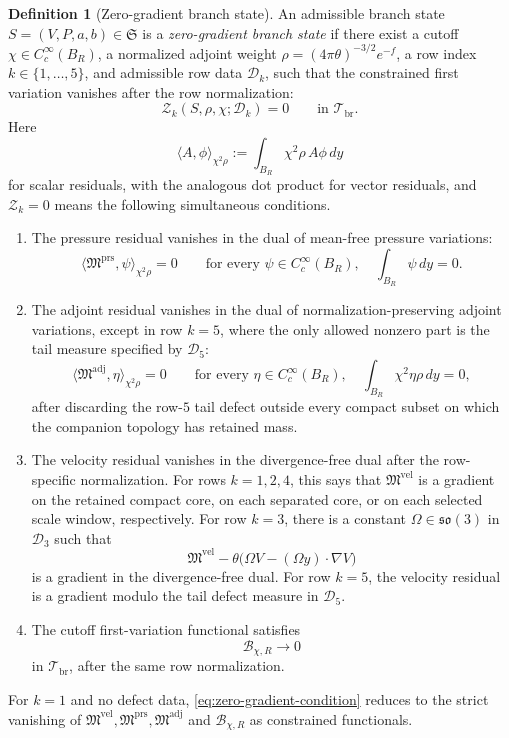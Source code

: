 \documentclass[11pt]{amsart}
\numberwithin{equation}{section}
\theoremstyle{plain}
\theoremstyle{definition}
\newtheorem{definition}[theorem]{Definition}
\theoremstyle{remark}
\newcommand{\State}{\mathfrak S}
\begin{document}
\begin{definition}[Zero-gradient branch state]
\label{def:zero-gradient-state}
An admissible branch state \(S=(V,P,a,b)\in\State\) is a
\emph{zero-gradient branch state} if there exist a cutoff
\(\chi\in C_c^\infty(B_R)\), a normalized adjoint weight
\(\rho=(4\pi\theta)^{-3/2}e^{-f}\), a row index
\(k\in\{1,\dots,5\}\), and admissible row data \(\mathcal D_k\), such that
the constrained first variation vanishes after the row normalization:
\begin{equation}\label{eq:zero-gradient-condition}
	\mathcal Z_k(S,\rho,\chi;\mathcal D_k)=0
	\qquad\text{in }\mathcal T_{\mathrm{br}}.
\end{equation}
Here
\[
	\langle A,\phi\rangle_{\chi^2\rho}:=\int_{B_R}\chi^2\rho\,A\phi\,dy
\]
for scalar residuals, with the analogous dot product for vector residuals,
and \(\mathcal Z_k=0\) means the following simultaneous conditions.
\begin{enumerate}[label=\textup{(\roman*)},leftmargin=2.2em]
	\item The pressure residual vanishes in the dual of mean-free pressure
	variations:
	\[
		\langle \mathfrak M^{\mathrm{prs}},\psi\rangle_{\chi^2\rho}=0
		\qquad
		\text{for every }\psi\in C_c^\infty(B_R),\quad
		\int_{B_R}\psi\,dy=0.
	\]

	\item The adjoint residual vanishes in the dual of normalization-preserving
	adjoint variations, except in row \(k=5\), where the only allowed
	nonzero part is the tail measure specified by \(\mathcal D_5\):
	\[
		\langle \mathfrak M^{\mathrm{adj}},\eta\rangle_{\chi^2\rho}=0
		\qquad
		\text{for every }\eta\in C_c^\infty(B_R),\quad
		\int_{B_R}\chi^2\eta\rho\,dy=0,
	\]
	after discarding the row-\(5\) tail defect outside every compact subset
	on which the companion topology has retained mass.

	\item The velocity residual vanishes in the divergence-free dual after the
	row-specific normalization.  For rows \(k=1,2,4\), this says that
	\(\mathfrak M^{\mathrm{vel}}\) is a gradient on the retained compact
	core, on each separated core, or on each selected scale window,
	respectively.  For row \(k=3\), there is a constant
	\(\Omega\in\mathfrak{so}(3)\) in \(\mathcal D_3\) such that
	\[
		\mathfrak M^{\mathrm{vel}}
		-\theta\bigl(\Omega V-(\Omega y)\cdot\nabla V\bigr)
	\]
	is a gradient in the divergence-free dual.  For row \(k=5\), the velocity
	residual is a gradient modulo the tail defect measure in \(\mathcal D_5\).

	\item The cutoff first-variation functional satisfies
	\begin{equation}\label{eq:cB-vanish}
		\mathcal B_{\chi,R}\to0
	\end{equation}
	in \(\mathcal T_{\mathrm{br}}\), after the same row normalization.
\end{enumerate}
For \(k=1\) and no defect data, \eqref{eq:zero-gradient-condition} reduces
to the strict vanishing of
\(\mathfrak M^{\mathrm{vel}},\mathfrak M^{\mathrm{prs}},
\mathfrak M^{\mathrm{adj}}\) and \(\mathcal B_{\chi,R}\) as constrained
functionals.
\end{definition}
\end{document}
